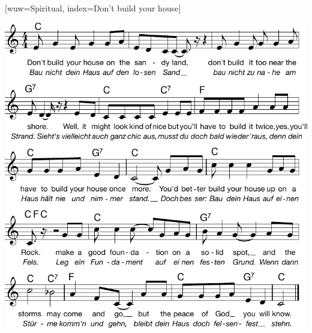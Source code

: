 [wuw={Spiritual}, index={Don't build your house}]

\markboth{\songtitle}{\songtitle}


\centering\includegraphics[width=1\textwidth]{Noten/Lied116.pdf}


\endsong

\beginscripture

\endscripture

\begin{intersong}

\end{intersong}